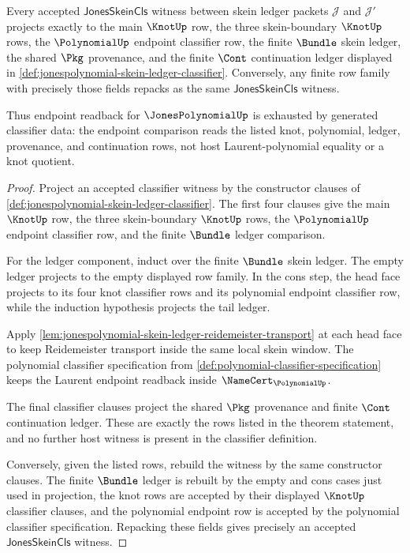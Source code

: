 \begin{theorem}
\label{thm:jonespolynomial-skein-endpoint-classifier-exhaustion}
Every accepted $\mathsf{JonesSkeinCls}$ witness between skein ledger packets
$\mathcal{J}$ and $\mathcal{J}'$ projects exactly to the main $\KnotUp$ row, the
three skein-boundary $\KnotUp$ rows, the $\PolynomialUp$ endpoint classifier
row, the finite $\Bundle$ skein ledger, the shared $\Pkg$ provenance, and the
finite $\Cont$ continuation ledger displayed in
\autoref{def:jonespolynomial-skein-ledger-classifier}. Conversely, any finite
row family with precisely those fields repacks as the same
$\mathsf{JonesSkeinCls}$ witness.

Thus endpoint readback for $\JonesPolynomialUp$ is exhausted by generated
classifier data: the endpoint comparison reads the listed knot, polynomial,
ledger, provenance, and continuation rows, not host Laurent-polynomial equality
or a knot quotient.
\end{theorem}
\begin{proof}
Project an accepted classifier witness by the constructor clauses of
\autoref{def:jonespolynomial-skein-ledger-classifier}. The first four clauses
give the main $\KnotUp$ row, the three skein-boundary $\KnotUp$ rows, the
$\PolynomialUp$ endpoint classifier row, and the finite $\Bundle$ ledger
comparison.

For the ledger component, induct over the finite $\Bundle$ skein ledger. The
empty ledger projects to the empty displayed row family. In the cons step, the
head face projects to its four knot classifier rows and its polynomial endpoint
classifier row, while the induction hypothesis projects the tail ledger.

Apply
\autoref{lem:jonespolynomial-skein-ledger-reidemeister-transport} at each head
face to keep Reidemeister transport inside the same local skein window. The
polynomial classifier specification from
\autoref{def:polynomial-classifier-specification} keeps the Laurent endpoint
readback inside $\NameCert_{\PolynomialUp}$.

The final classifier clauses project the shared $\Pkg$ provenance and finite
$\Cont$ continuation ledger. These are exactly the rows listed in the theorem
statement, and no further host witness is present in the classifier definition.

Conversely, given the listed rows, rebuild the witness by the same constructor
clauses. The finite $\Bundle$ ledger is rebuilt by the empty and cons cases just
used in projection, the knot rows are accepted by their displayed
$\KnotUp$ classifier clauses, and the polynomial endpoint row is accepted by the
polynomial classifier specification. Repacking these fields gives precisely an
accepted $\mathsf{JonesSkeinCls}$ witness.
\end{proof}


